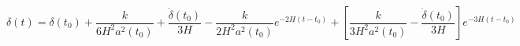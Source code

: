 \begin{equation}\label{deltinexp}
\delta(t)=\delta(t_0)+\frac{k}{6H^2a^2(t_0)}+\frac{\dot{\delta}(t_0)}{3H}
-\frac{k}{2H^2a^2(t_0)}e^{-2H(t-t_0)}+\left[\frac{k}{3H^2a^2(t_0)}-
\frac{\dot{\delta}(t_0)}{3H}\right]e^{-3H(t-t_0)}
\end{equation}

